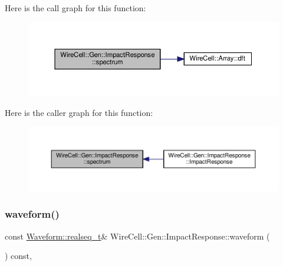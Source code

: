 Here is the call graph for this function\+:
\nopagebreak
\begin{figure}[H]
\begin{center}
\leavevmode
\includegraphics[width=350pt]{class_wire_cell_1_1_gen_1_1_impact_response_a8bd5c0dbe10911359e29892d4f1380c1_cgraph}
\end{center}
\end{figure}
Here is the caller graph for this function\+:
\nopagebreak
\begin{figure}[H]
\begin{center}
\leavevmode
\includegraphics[width=350pt]{class_wire_cell_1_1_gen_1_1_impact_response_a8bd5c0dbe10911359e29892d4f1380c1_icgraph}
\end{center}
\end{figure}
\mbox{\label{class_wire_cell_1_1_gen_1_1_impact_response_a50a66f592c1eb71279cbf6981fd5f8e5}} 
\subsubsection{\texorpdfstring{waveform()}{waveform()}}
{\footnotesize\ttfamily const \hyperlink{namespace_wire_cell_1_1_waveform_a479175e541c8545e87cd8063b74b6956}{Waveform\+::realseq\+\_\+t}\& Wire\+Cell\+::\+Gen\+::\+Impact\+Response\+::waveform (\begin{DoxyParamCaption}{ }\end{DoxyParamCaption}) const\hspace{0.3cm}{\ttfamily [inline]}, {\ttfamily [virtual]}}



